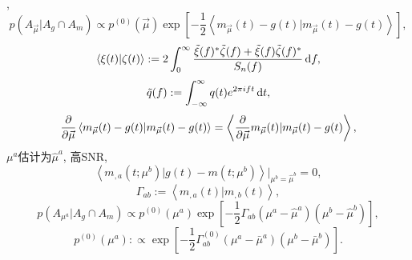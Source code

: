 \cite{Poisson1995}, 
\begin{equation}
    p({A_{\vec{\mu}}}|A_g\cap A_m)\propto p^{(0)}(\vec{\mu})\exp[
        -\frac{1}{2}\left\langle 
            m_{\vec{\mu}}(t)-g(t)|m_{\vec{\mu}}(t)-g(t)
        \right\rangle 
    ],
\end{equation}
\begin{equation}
    \left\langle \xi(t)|\zeta(t)\right\rangle:=2\int_0^\infty\frac{\tilde{\xi}(f)^*\tilde{\zeta}(f)+\tilde{\xi}(f)\tilde{\zeta}(f)^*}{S_n(f)}\,\mathrm{d} f,
\end{equation}
\begin{equation}
    \tilde{q}(f):=\int_{-\infty}^{\infty}q(t)e^{2\pi ift}\,\mathrm{d} t,
\end{equation}
\begin{equation}
    \frac{\partial}{\partial\vec{\mu}}\left\langle 
        m_{\vec{\mu}}(t)-g(t)|m_{\vec{\mu}}(t)-g(t)
    \right\rangle =\left\langle \frac{\partial }{\partial \vec{\mu}}m_{\vec{\mu}}(t)|m_{\vec{\mu}}(t)-g(t)\right\rangle,
\end{equation}
$\mu^a$估计为$\hat{\mu}^a$, 高SNR,
\begin{equation}
    \left\langle m_{,a}(t;\mu^b)|g(t)-m(t;\mu^b)\right\rangle|_{\mu^b=\hat{\mu}^b}=0,
\end{equation}
\begin{equation}
    \Gamma_{ab}:=\left\langle m_{,a}(t)|m_{,b}(t)\right\rangle,
\end{equation}
\begin{equation}
    p({A_{\mu^a}}|A_g\cap A_m)\propto p^{(0)}({\mu^a})\exp[
        -\frac{1}{2}\Gamma_{ab}(\mu^a-\hat{\mu}^a)(\mu^b-\hat{\mu}^b)
    ],
\end{equation}
\begin{equation}
    p^{(0)}({\mu^a}):\propto\exp[
        -\frac{1}{2}\Gamma^{(0)}_{ab}(\mu^a-\bar{\mu}^a)(\mu^b-\bar{\mu}^b)
    ].
\end{equation}
